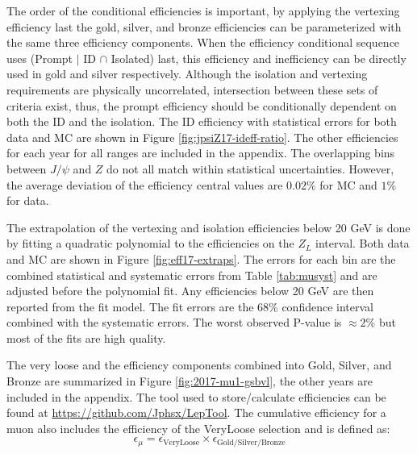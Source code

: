 The order of the conditional efficiencies is important, by applying the vertexing efficiency last the gold, silver, and bronze efficiencies can be parameterized with the same three efficiency components. When the efficiency conditional sequence uses (Prompt $|$ ID $\cap$ Isolated) last, this efficiency and inefficiency can be directly used in gold and silver respectively. Although the isolation and vertexing requirements are physically uncorrelated, intersection between these sets of criteria exist, thus, the prompt efficiency should be conditionally dependent on both the ID and the isolation. The ID efficiency with statistical errors for both data and MC are shown in Figure \ref{fig:jpsiZ17-ideff-ratio}. The other efficiencies for each year for all \pt ranges are included in the appendix. The overlapping bins between $J/\psi$ and $Z$ do not all match within statistical uncertainties. However, the average deviation of the efficiency central values are $0.02\%$ for MC and $1\%$ for data.  



The extrapolation of the vertexing and isolation efficiencies below 20 GeV is done by fitting a quadratic polynomial to the efficiencies on the $Z_L$ interval.  Both data and MC are shown in Figure \ref{fig:eff17-extraps}.  The errors for each bin are the combined statistical and systematic errors from Table \ref{tab:musyst} and are adjusted before the polynomial fit. Any efficiencies below 20 GeV are then reported from the fit model. The fit errors are the 68\% confidence interval combined with the systematic errors. The worst observed P-value is $\approx 2\%$ but most of the fits are high quality.

The very loose and the efficiency components combined into Gold, Silver, and Bronze are summarized in Figure \ref{fig:2017-mu1-gsbvl}, the other years are included in the appendix. The tool used to store/calculate efficiencies can be found at \url{https://github.com/Jphsx/LepTool}.  The cumulative efficiency for a muon also includes the efficiency of the VeryLoose selection and is defined as:
\begin{equation}
\epsilon_\mu = \epsilon_{\text{VeryLoose}} \times \epsilon_{\text{Gold/Silver/Bronze}}
\end{equation}

\newcommand\FigureTwo[4]{%
\begin{figure}[!htbp]%
\centering
\texttt{[image: fig/Lep\_Obj\_plots/\#1]}\hfill
\texttt{[image: fig/Lep\_Obj\_plots/\#2]}\hfill
\caption{#4}
\label{#3}
\end{figure}}


